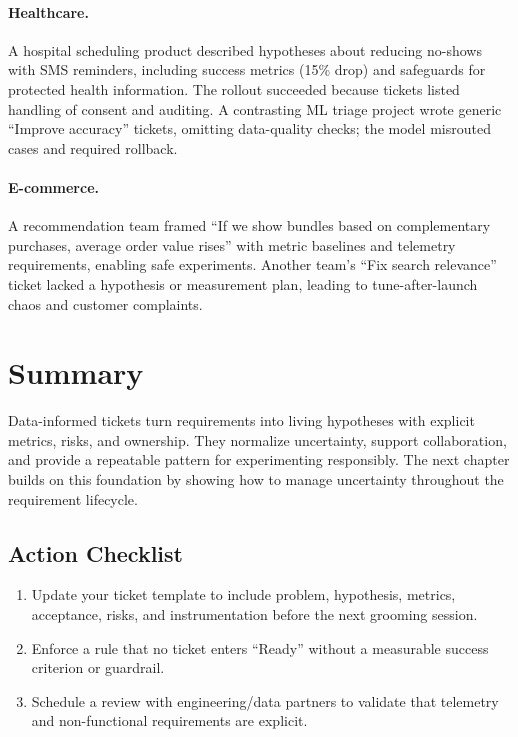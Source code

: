 \paragraph{Healthcare.} A hospital scheduling product described hypotheses about reducing no-shows with SMS reminders, including success metrics (15\% drop) and safeguards for protected health information. The rollout succeeded because tickets listed handling of consent and auditing. A contrasting ML triage project wrote generic ``Improve accuracy'' tickets, omitting data-quality checks; the model misrouted cases and required rollback.

\paragraph{E-commerce.} A recommendation team framed ``If we show bundles based on complementary purchases, average order value rises'' with metric baselines and telemetry requirements, enabling safe experiments. Another team’s ``Fix search relevance'' ticket lacked a hypothesis or measurement plan, leading to tune-after-launch chaos and customer complaints.

\section{Summary}
\label{sec:tickets-summary}

Data-informed tickets turn requirements into living hypotheses with explicit metrics, risks, and ownership. They normalize uncertainty, support collaboration, and provide a repeatable pattern for experimenting responsibly. The next chapter builds on this foundation by showing how to manage uncertainty throughout the requirement lifecycle.

\subsection{Action Checklist}
\begin{enumerate}
    \item Update your ticket template to include problem, hypothesis, metrics, acceptance, risks, and instrumentation before the next grooming session.
    \item Enforce a rule that no ticket enters ``Ready'' without a measurable success criterion or guardrail.
    \item Schedule a review with engineering/data partners to validate that telemetry and non-functional requirements are explicit.
\end{enumerate}

